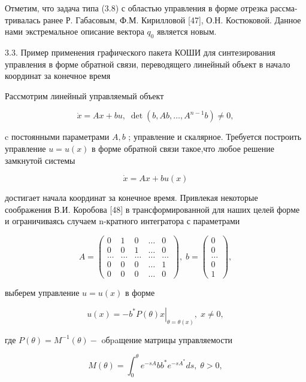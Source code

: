 \documentclass[10pt]{article}
\begin{document}
Отметим, что задача типа (3.8) с областью управления в форме отрезка рассма- тривалась ранее Р. Габасовым, Ф.М. Кирилловой [47], О.Н. Костюковой. Данное нами экстремальное описание вектора \({q}_{0}\) является новым.

3.3. Пример применения графического пакета КОШИ для синтезирования управления в форме обратной связи, переводящего линейный объект в начало координат за конечное время

Рассмотрим линейный управляемый объект

\[
\dot{x} = {Ax} + {bu},\;\det \left( {b,{Ab},\ldots ,{A}^{n - 1}b}\right)  \neq  0, \tag{3.14}
\]

c постоянными параметрами \(A,b\) ; управление и скалярное. Требуется построить управление \(u = u\left( x\right)\) в форме обратной связи такое,что любое решение замкнутой системы

\[
\dot{x} = {Ax} + {bu}\left( x\right) \tag{3.15}
\]

достигает начала координат за конечное время. Привлекая некоторые соображения В.И. Коробова [48] в трансформированной для наших целей форме и ограничиваясь случаем n-кратного интегратора с параметрами

\[
A = \left( \begin{array}{ccccc} 0 & 1 & 0 & \ldots & 0 \\  0 & 0 & 1 & \ldots & 0 \\  \ldots & \ldots & \ldots & \ldots & \ldots \\  0 & 0 & 0 & \ldots & 1 \\  0 & 0 & 0 & \ldots & 0 \end{array}\right) ,\;b = \left( \begin{array}{c} 0 \\  0 \\  \ldots \\  0 \\  1 \end{array}\right) , \tag{3.16}
\]

выберем управление \(u = u\left( x\right)\) в форме

\[
u\left( x\right)  =  - {\left. {b}^{ * }P\left( \theta \right) x\right| }_{\theta  = \theta \left( x\right) },\;x \neq  0, \tag{3.17}
\]

где \(P\left( \theta \right)  = {M}^{-1}\left( \theta \right)  -\) oбpaщение матрицы управляемости

\[
M\left( \theta \right)  = {\int }_{0}^{\theta }{e}^{-{sA}}b{b}^{ * }{e}^{-s{A}^{ * }}{ds},\;\theta  > 0, \tag{3.18}
\]
\end{document}
